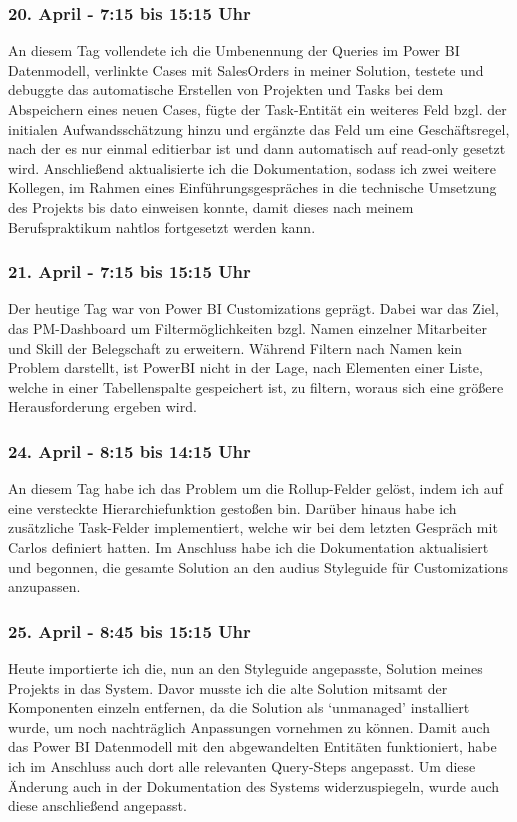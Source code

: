 \subsubsection*{20. April - 7:15 bis 15:15 Uhr}
An diesem Tag vollendete ich die Umbenennung der Queries im Power BI Datenmodell, verlinkte Cases mit SalesOrders in meiner Solution, testete und debuggte das automatische Erstellen von Projekten und Tasks bei dem Abspeichern eines neuen Cases, fügte der Task-Entität ein weiteres Feld bzgl. der initialen Aufwandsschätzung hinzu und ergänzte das Feld um eine Geschäftsregel, nach der es nur einmal editierbar ist und dann automatisch auf read-only gesetzt wird. Anschließend aktualisierte ich die Dokumentation, sodass ich zwei weitere Kollegen, im Rahmen eines Einführungsgespräches in die technische Umsetzung des Projekts bis dato einweisen konnte, damit dieses nach meinem Berufspraktikum nahtlos fortgesetzt werden kann. 

\subsubsection*{21. April - 7:15 bis 15:15 Uhr}
Der heutige Tag war von Power BI Customizations geprägt. Dabei war das Ziel, das PM-Dashboard um Filtermöglichkeiten bzgl. Namen einzelner Mitarbeiter und Skill der Belegschaft zu erweitern. Während Filtern nach Namen kein Problem darstellt, ist PowerBI nicht in der Lage, nach Elementen einer Liste, welche in einer Tabellenspalte gespeichert ist, zu filtern, woraus sich eine größere Herausforderung ergeben wird.

\subsubsection*{24. April - 8:15 bis 14:15 Uhr}
An diesem Tag habe ich das Problem um die Rollup-Felder gelöst, indem ich auf eine versteckte Hierarchiefunktion gestoßen bin. Darüber hinaus habe ich zusätzliche Task-Felder implementiert, welche wir bei dem letzten Gespräch mit Carlos definiert hatten. Im Anschluss habe ich die Dokumentation aktualisiert und begonnen, die gesamte Solution an den audius Styleguide für Customizations anzupassen.

\subsubsection*{25. April - 8:45 bis 15:15 Uhr}
Heute importierte ich die, nun an den Styleguide angepasste, Solution meines Projekts in das System. Davor musste ich die alte Solution mitsamt der Komponenten einzeln entfernen, da die Solution als \enquote*{unmanaged} installiert wurde, um noch nachträglich Anpassungen vornehmen zu können. Damit auch das Power BI Datenmodell mit den abgewandelten Entitäten funktioniert, habe ich im Anschluss auch dort alle relevanten Query-Steps angepasst. Um diese Änderung auch in der Dokumentation des Systems widerzuspiegeln, wurde auch diese anschließend angepasst.

